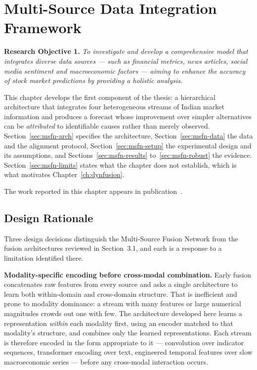 \chapter{Multi-Source Data Integration Framework}
\label{ch:fusion}

\textbf{Research Objective 1.} \emph{To investigate and develop a comprehensive model that
integrates diverse data sources --- such as financial metrics, news articles, social media
sentiment and macroeconomic factors --- aiming to enhance the accuracy of stock market
predictions by providing a holistic analysis.}

\vspace{0.4em}
This chapter develops the first component of the thesis: a hierarchical architecture that
integrates four heterogeneous streams of Indian market information and produces a forecast whose
improvement over simpler alternatives can be \emph{attributed} to identifiable causes rather
than merely observed. Section~\ref{sec:msfn-arch} specifies the architecture,
Section~\ref{sec:msfn-data} the data and the alignment protocol, Section~\ref{sec:msfn-setup}
the experimental design and its assumptions, and Sections~\ref{sec:msfn-results}
to~\ref{sec:msfn-robust} the evidence. Section~\ref{sec:msfn-limits} states what the chapter does
not establish, which is what motivates Chapter~\ref{ch:dynfusion}.

The work reported in this chapter appears in publication~.

\section{Design Rationale}
\label{sec:msfn-rationale}

Three design decisions distinguish the Multi-Source Fusion Network from the fusion
architectures reviewed in Section~3.1, and each is a response to a limitation identified there.

\textbf{Modality-specific encoding before cross-modal combination.} Early fusion concatenates
raw features from every source and asks a single architecture to learn both within-domain and
cross-domain structure. That is inefficient and prone to modality dominance: a stream with many
features or large numerical magnitudes crowds out one with few. The architecture developed here
learns a representation \emph{within} each modality first, using an encoder matched to that
modality's structure, and combines only the learned representations. Each stream is therefore
encoded in the form appropriate to it --- convolution over indicator sequences, transformer
encoding over text, engineered temporal features over slow macroeconomic series --- before any
cross-modal interaction occurs.

